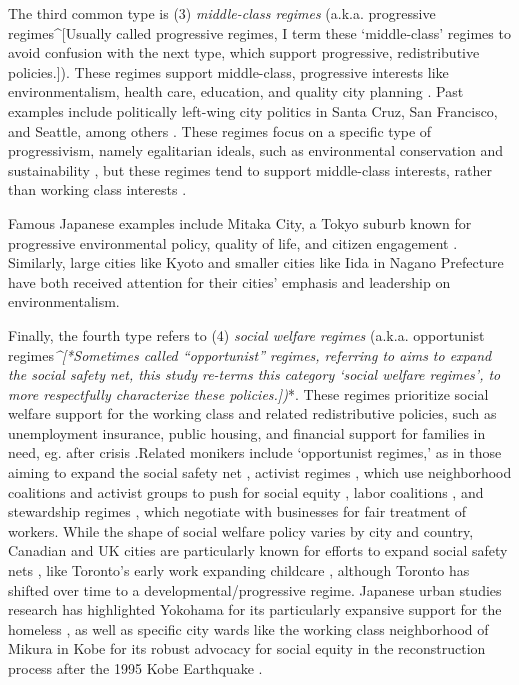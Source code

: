 \documentclass[preprint, 3p,
authoryear]{elsarticle} %
\begin{document}
The third common type is (3) \emph{middle-class regimes} (a.k.a.
progressive regimes\^{}{[}Usually called progressive regimes, I term
these `middle-class' regimes to avoid confusion with the next type,
which support progressive, redistributive policies.{]}). These regimes
support middle-class, progressive interests like environmentalism,
health care, education, and quality city planning
\citep{deleon_1992, gendron_and_domhoff_2018, rosdil_2016}. Past
examples include politically left-wing city politics in Santa Cruz, San
Francisco, and Seattle, among others \citep{gendron_and_domhoff_2018}.
These regimes focus on a specific type of progressivism, namely
egalitarian ideals, such as environmental conservation and
sustainability \citep{rosol_et_al_2017}, but these regimes tend to
support middle-class interests, rather than working class interests
\citep{kilburn_2004}.

Famous Japanese examples include Mitaka City, a Tokyo suburb known for
progressive environmental policy, quality of life, and citizen
engagement \citep{takao_2006}. Similarly, large cities like Kyoto
\citep{sugiyama_and_takeuchi_2008} and smaller cities like Iida in
Nagano Prefecture \citep{fraser_et_al_2020} have both received attention
for their cities' emphasis and leadership on environmentalism.

Finally, the fourth type refers to (4) \emph{social welfare regimes}
(a.k.a. opportunist regimes\emph{\^{}{[}*Sometimes called
``opportunist'' regimes, referring to aims to expand the social safety
net, this study re-terms this category `social welfare regimes', to more
respectfully characterize these policies.{]})}*. These regimes
prioritize social welfare support for the working class and related
redistributive policies, such as unemployment insurance, public housing,
and financial support for families in need, eg. after crisis
\citep{stone_1993, thompson_2005, camou_2014, lai_and_chui_2014, arbaci_2019}.Related
monikers include `opportunist regimes,' as in those aiming to expand the
social safety net \citep{stone_1989}, activist regimes
\citep{clark_2001}, which use neighborhood coalitions and activist
groups to push for social equity \citep{thompson_2005}, labor coalitions
\citep{camou_2014}, and stewardship regimes \citep{nissen_1995}, which
negotiate with businesses for fair treatment of workers. While the shape
of social welfare policy varies by city and country, Canadian and UK
cities are particularly known for efforts to expand social safety nets
\citep{saraceno_2002}, like Toronto's early work expanding childcare
\citep{mahon_2007}, although Toronto has shifted over time to a
developmental/progressive regime. Japanese urban studies research has
highlighted Yokohama for its particularly expansive support for the
homeless \citep{hayashi_2013}, as well as specific city wards like the
working class neighborhood of Mikura in Kobe for its robust advocacy for
social equity in the reconstruction process after the 1995 Kobe
Earthquake \citep{yasui_2007}.
\end{document}

